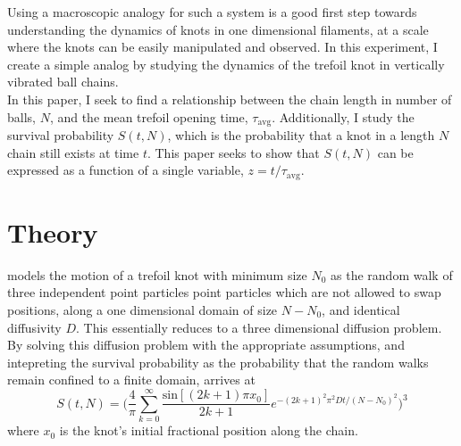 \documentclass[11pt]{article}
\begin{document}
Using a macroscopic analogy for such a system is a good first step towards 
understanding the dynamics of knots in one dimensional filaments, at a scale where the knots can 
be easily manipulated and observed. In this experiment, I create a simple analog
by studying the dynamics of the trefoil knot in vertically vibrated ball chains.\\

In this paper, I seek to find a relationship between the chain length in number of balls, $N$, and 
the mean trefoil opening time, $\tau_{\text{avg}}$. Additionally, I study the survival probability
$S(t,N)$, which is the probability that a knot in a length $N$ chain still exists at time $t$. This paper 
seeks to show that $S(t,N)$ can be expressed as a function of a single variable, $z=t/\tau_{\text{avg}}$.



\section{Theory}
\label{sec:theory}
\cite{BenNaim2001} models the motion of a trefoil knot with minimum size $N_0$ as the random walk of three
independent point particles point particles which are not allowed to swap positions, along a one dimensional domain 
of size $N-N_0$, and identical diffusivity $D$. This essentially reduces to a three dimensional diffusion 
problem. By solving this diffusion problem with the appropriate assumptions, and intepreting 
the survival probability as the probability that the random walks remain confined to a finite 
domain, \cite{BenNaim2001} arrives at 
    \begin{equation}
        \label{eq:survival}
        S(t, N)= \Bigg( \frac{4}{\pi} \sum_{k=0}^{\infty} 
    \frac{\text{sin}[(2k+1)\pi x_0]}{2k+1} e^{-(2k+1)^2\pi^2 D t / (N - N_0)^2} \Bigg)^3
    \end{equation} 
where $x_0$ is the knot's initial fractional position along the chain.\\
\end{document}
